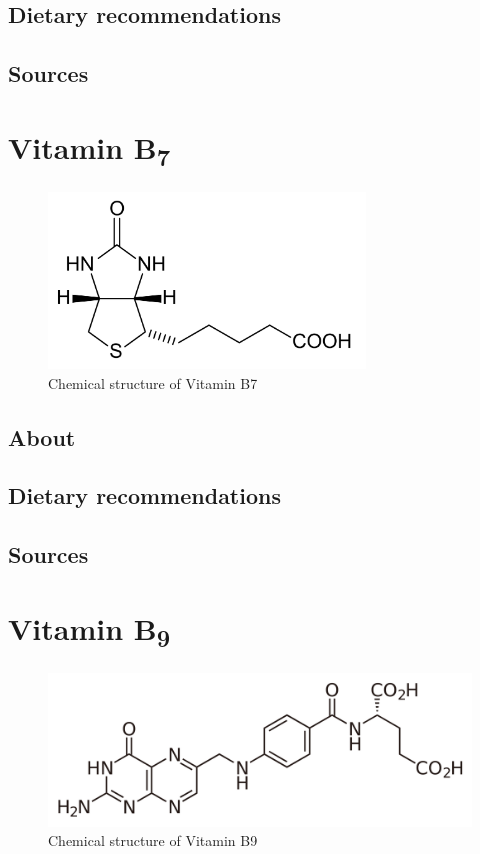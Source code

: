 \documentclass{book}
\begin{document}
\section{Dietary recommendations}


\section{Sources}


\chapter{Vitamin B\textsubscript{7}}
\begin{figure}[h]
	\caption{Chemical structure of Vitamin B7}
	\centering \includegraphics[width=0.75\textwidth]{images/Vitamin_B7_chemical_structure}
\end{figure}
\newpage

\section{About}


\section{Dietary recommendations}


\section{Sources}


\chapter{Vitamin B\textsubscript{9}}
\begin{figure}[h]
	\caption{Chemical structure of Vitamin B9}
	\centering \includegraphics[width=\textwidth]{images/Vitamin_B9_chemical_structure}
\end{figure}
\newpage
\end{document}

